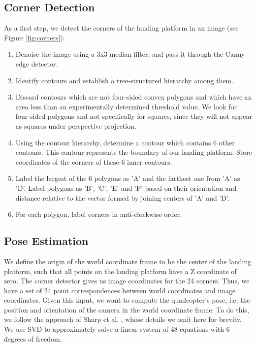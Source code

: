 \documentclass[10pt]{scrartcl} %
\begin{document}
\subsection{Corner Detection}

As a first step, we detect the corners of the landing platform in an image (see
Figure \ref{fig:corners}):

\begin{enumerate}
\setlength{\itemsep}{0pt}
\setlength{\parskip}{0pt}
\setlength{\parsep}{0pt}
\item{
    Denoise the image using a 3x3 median filter, and pass it through the Canny
    edge detector.}
\item{
    Identify contours and establish a tree-structured hierarchy among them.}
\item{
    Discard contours which are not four-sided convex polygons and which have an
    area less than an experimentally determined threshold value.  We look for
    four-sided polygons and not specifically for squares, since they will not
    appear as squares under perspective projection.}
\item{
    Using the contour hierarchy, determine a contour which contains 6 other
    contours. This contour represents the boundary of our landing platform.
    Store coordinates of the corners of these 6 inner contours.}
\item{
    Label the largest of the 6 polygons as 'A' and the farthest one from 'A' as
    'D'. Label polygons as 'B', 'C', 'E' and 'F' based on their orientation and
    distance relative to the vector formed by joining centers of 'A' and 'D'.}
\item{
    For each polygon, label corners in anti-clockwise order.}
\end{enumerate}


\subsection{Pose Estimation}

We define the origin of the world coordinate frame to be the center of the
landing platform, such that all points on the landing platform have a Z
coordinate of zero. The corner detector gives us image coordinates for the 24
corners. Thus, we have a set of 24 point correspondences between world
coordinates and image coordinates. Given this input, we want to compute the
quadcopter's pose, i.e. the position and orientation of the camera in the world
coordinate frame. To do this, we follow the approach of Sharp et al.
\cite{sharp_et_al_2001}, whose details we omit here for brevity. We use SVD to
approximately solve a linear system of 48 equations with 6 degrees of freedom.
\end{document}
